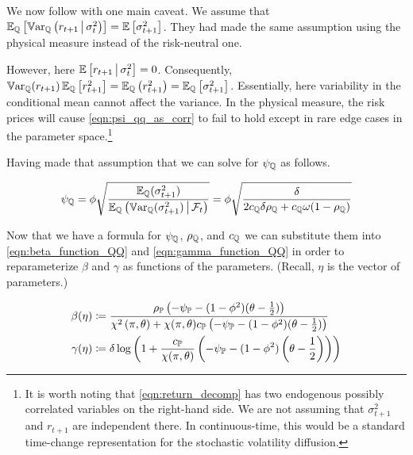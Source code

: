 \documentclass[11pt, letterpaper, twoside, final]{article}
\begin{document}
We now follow \textcite{khrapov2016affine} with one main caveat. 
We assume that $\operatorname{\mathbb{E}}_{\mathbb{Q}}\left[\operatorname{\mathbb{V}ar}_{\mathbb{Q}}\left(r_{t+1} \,\middle\vert\, \sigma^2_t\right)\right] =
\operatorname{\mathbb{E}}\left[\sigma^2_{t+1}\right]$.
They had made the same assumption using the physical measure instead of the risk-neutral one.


However, here $\operatorname{\mathbb{E}}\left[r_{t+1} \,\middle\vert\, \sigma^2_{t}\right] = 0$.
Consequently, $\operatorname{\mathbb{V}ar}_{\mathbb{Q}}(r_{t+1}) \operatorname{\mathbb{E}}_{\mathbb{Q}}\left[r_{t+1}^2\right]  = \operatorname{\mathbb{E}}_{\mathbb{Q}}\left(r^2_{t+1}\right) =
\operatorname{\mathbb{E}}_{\mathbb{Q}}\left[\sigma^2_{t+1}\right]$.
Essentially, here variability in the conditional mean cannot affect the variance.
In the physical measure, the risk prices will cause  \cref{eqn:psi_qq_as_corr} to fail to hold except in rare edge
cases in the parameter space.\footnote{It is worth noting that  \cref{eqn:return_decomp} has two endogenous
    possibly correlated variables on the right-hand side. We are not assuming that $\sigma^2_{t+1}$ and $r_{t+1}$
    are independent there. In continuous-time, this would be a standard time-change representation for the
stochastic volatility diffusion.}

Having made that assumption that we can solve for $\psi_{\mathbb{Q}}$ as follows.

\begin{equation}
    \psi_{\mathbb{Q}} =  \phi \sqrt{\frac{\operatorname{\mathbb{E}}_{\mathbb{Q}}(\sigma^2_{t+1})}{\operatorname{\mathbb{E}}_{\mathbb{Q}}\left(\operatorname{\mathbb{V}ar}_{\mathbb{Q}}(\sigma^2_{t+1}) \,\middle\vert\, \mathcal{F}_t
    \right)}}
    = \phi \sqrt{\frac{\delta}{2 c_{\mathbb{Q}} \delta \rho_{\mathbb{Q}} + c_{\mathbb{Q}} \omega (1 - \rho_{\mathbb{Q}})}}
    \label{eqn:psi_function}
\end{equation}

Now that we have a formula for $\psi_{\mathbb{Q}}$, $\rho_{\mathbb{Q}}$, and $c_{\mathbb{Q}}$ we can substitute them into
\cref{eqn:beta_function_QQ}  and \cref{eqn:gamma_function_QQ} in order to reparameterize $\beta$ and $\gamma$ as
functions of the parameters.
(Recall, $\eta$ is the vector of parameters.)

\begin{align}
    \label{eqn:beta_function}
    \beta(\eta) &\coloneqq \frac{\rho_{\PP} \left(-\psi_{\PP} - (1- \phi^2)(\theta -
    \frac{1}{2})\right)}{\chi^2\left(\pi, \theta\right) + \chi(\pi, \theta)c_{\PP} \left(-\psi_{\PP} - (1-
    \phi^2)(\theta-\frac{1}{2} )\right)}  \\
%
    \label{eqn:gamma_function}
    \gamma(\eta) &\coloneqq \delta \log\left(1 + \frac{c_{\PP}}{\chi(\pi,\theta)} \left(-\psi_{\PP} - (1-
    \phi^2)\left(\theta - \frac{1}{2}\right) \right)\right)
\end{align}
\end{document}
